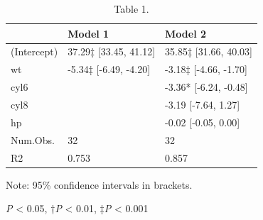 \begin{table}[!t]
\centering
\caption{Table 1.}
\begin{threeparttable}
\begin{tabular}{lll}
\toprule
& Model 1 & Model 2 \\ \midrule
(Intercept) & 37.29‡ [33.45, 41.12] & 35.85‡ [31.66, 40.03] \\
wt & -5.34‡ [-6.49, -4.20] & -3.18‡ [-4.66, -1.70] \\
cyl6 &  & -3.36* [-6.24, -0.48] \\
cyl8 &  & -3.19 [-7.64, 1.27] \\
hp &  & -0.02 [-0.05, 0.00] \\
Num.Obs. & 32 & 32 \\
R2 & 0.753 & 0.857 \\
\bottomrule
\end{tabular}
\begin{tablenotes}[flushleft]\footnotesize
\item Note: 95\% confidence intervals in brackets.
\item *\textit{P} < 0.05, †\textit{P} < 0.01, ‡\textit{P} < 0.001
\end{tablenotes}
\end{threeparttable}
\end{table}

